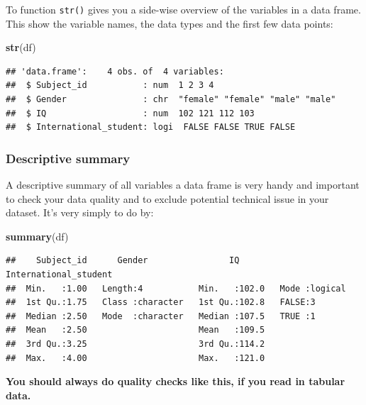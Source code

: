 \documentclass[
]{scrartcl}
\newenvironment{Shaded}{\begin{snugshade}}{\end{snugshade}}
\newcommand{\KeywordTok}[1]{\textcolor[rgb]{0.13,0.29,0.53}{\textbf{#1}}}
\newcommand{\NormalTok}[1]{#1}
\begin{document}
To function \texttt{str()} gives you a side-wise overview of the variables in a data frame. This show the variable names, the data types and the first few data points:

\begin{Shaded}
\begin{Highlighting}[]
\KeywordTok{str}\NormalTok{(df)}
\end{Highlighting}
\end{Shaded}

\begin{verbatim}
## 'data.frame':    4 obs. of  4 variables:
##  $ Subject_id           : num  1 2 3 4
##  $ Gender               : chr  "female" "female" "male" "male"
##  $ IQ                   : num  102 121 112 103
##  $ International_student: logi  FALSE FALSE TRUE FALSE
\end{verbatim}

\hypertarget{descriptive-summary}{%
\subsubsection*{Descriptive summary}\label{descriptive-summary}}

A descriptive summary of all variables a data frame is very handy and important to check your data quality and to exclude potential technical issue in your dataset. It's very simply to do by:

\begin{Shaded}
\begin{Highlighting}[]
\KeywordTok{summary}\NormalTok{(df)}
\end{Highlighting}
\end{Shaded}

\begin{verbatim}
##    Subject_id      Gender                IQ        International_student
##  Min.   :1.00   Length:4           Min.   :102.0   Mode :logical        
##  1st Qu.:1.75   Class :character   1st Qu.:102.8   FALSE:3              
##  Median :2.50   Mode  :character   Median :107.5   TRUE :1              
##  Mean   :2.50                      Mean   :109.5                        
##  3rd Qu.:3.25                      3rd Qu.:114.2                        
##  Max.   :4.00                      Max.   :121.0
\end{verbatim}

\textbf{You should always do quality checks like this, if you read in tabular data.}
\end{document}
